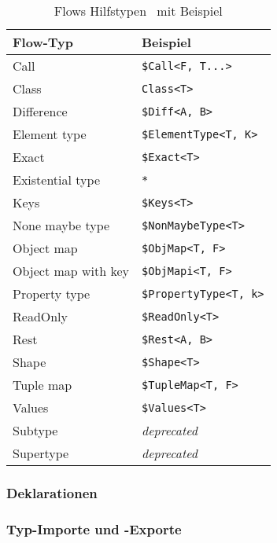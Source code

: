 \begin{table}
  \begin{tabular}{@{}ll@{}}
    \toprule
    \textbf{Flow-Typ}   & \textbf{Beispiel}              \\
    \midrule
    Call                & \texttt{\$Call<F, T...>}       \\
    Class               & \texttt{Class<T>}              \\
    Difference          & \texttt{\$Diff<A, B>}          \\
    Element type        & \texttt{\$ElementType<T, K>}   \\
    Exact               & \texttt{\$Exact<T>}            \\
    Existential type    & \texttt{*}                     \\
    Keys                & \texttt{\$Keys<T>}             \\
    None maybe type     & \texttt{\$NonMaybeType<T>}     \\
    Object map          & \texttt{\$ObjMap<T, F>}        \\
    Object map with key & \texttt{\$ObjMapi<T, F>}       \\
    Property type       & \texttt{\$PropertyType<T, k>}  \\
    ReadOnly            & \texttt{\$ReadOnly<T>}         \\
    Rest                & \texttt{\$Rest<A, B>}          \\
    Shape               & \texttt{\$Shape<T>}            \\
    Tuple map           & \texttt{\$TupleMap<T, F>}      \\
    Values              & \texttt{\$Values<T>}           \\
    Subtype             & \textit{deprecated}            \\
    Supertype           & \textit{deprecated}            \\
    \bottomrule
  \end{tabular}
  \caption{Flows Hilfstypen~\autocite{FLOW_UTILITY_TYPES} mit Beispiel}
  \label{tab:flow-utility-types}
\end{table}

\subsubsection{Deklarationen}

\subsubsection{Typ-Importe und -Exporte}

